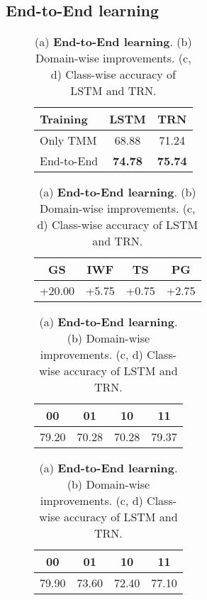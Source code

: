\documentclass[final]{cvpr}
\begin{document}
\subsection{End-to-End learning}
\label{sec:exp_e2e_learn}
\begin{table}[]
\small
\centering
\begin{subfigure}[t]{0.45\linewidth}
\setlength\tabcolsep{4pt}
\begin{tabular}{lcc}
\toprule
\textbf{Training}    & \textbf{LSTM} & \textbf{TRN}   \\ \midrule
Only TMM & 68.88         & 71.24 \\
End-to-End           & \textbf{74.78}         & \textbf{75.74} \\ \bottomrule
\end{tabular}
\caption{}
\label{tab:e2elearn_a}
\end{subfigure}
\hfill
\begin{subfigure}[t]{0.45\linewidth}
\setlength\tabcolsep{4pt}
\begin{tabular}{@{}cccc@{}}
\toprule
\textbf{GS} & \textbf{IWF} & \textbf{TS} & \textbf{PG} \\ \midrule
+20.00       & +5.75         & +0.75        & +2.75        \\ \bottomrule
\end{tabular}
\caption{}
\label{tab:e2elearn_b}
\end{subfigure}
\begin{subfigure}[t]{0.45\linewidth}
\setlength\tabcolsep{4pt}
\begin{tabular}{@{}cccc@{}}
\toprule
\textbf{00} & \textbf{01} & \textbf{10} & \textbf{11} \\ \midrule
79.20       & 70.28       & 70.28       & 79.37       \\ \bottomrule
\end{tabular}
\caption{}
\label{tab:e2elearn_c}
\end{subfigure}
\hfill
\begin{subfigure}[t]{0.45\linewidth}
\setlength\tabcolsep{4pt}
\begin{tabular}{@{}cccc@{}}
\toprule
\textbf{00} & \textbf{01} & \textbf{10} & \textbf{11} \\ \midrule
79.90       & 73.60       & 72.40       & 77.10       \\ \bottomrule
\end{tabular}
\caption{}
\label{tab:e2elearn_d}
\end{subfigure}
\caption{(a) \textbf{End-to-End learning}. (b) Domain-wise improvements. (c, d) Class-wise accuracy of LSTM and TRN.}

\end{table}
\end{document}
